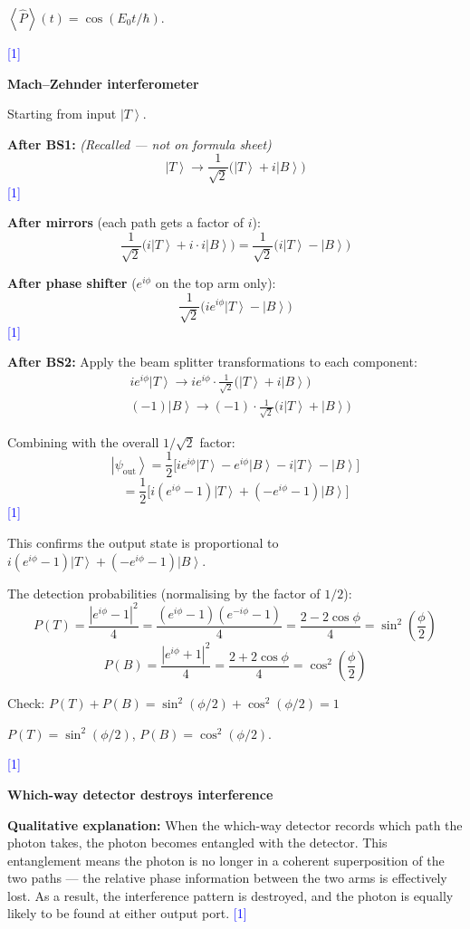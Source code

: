 \documentclass[12pt,a4paper]{article}
\newcommand{\markstep}[1]{\hfill\textcolor{blue}{[#1]}}
\newcommand{\finalanswer}[1]{%
  \begin{tcolorbox}[colback=green!5!white,colframe=green!50!black,boxrule=0.5pt]
  #1
  \end{tcolorbox}
}
\newcommand{\recalled}{\textit{(Recalled --- not on formula sheet)}}
\renewcommand{\ket}[1]{\left|#1\right\rangle}
\renewcommand{\expect}[1]{\left\langle #1\right\rangle}
\begin{document}
\begin{parts}
\finalanswer{$\expect{\hat{P}}(t) = \cos(E_0 t/\hbar)$.}
\markstep{1}

\item \textbf{Mach--Zehnder interferometer} 

Starting from input $\ket{T}$.

\textbf{After BS1:} \recalled
\[
\ket{T} \to \frac{1}{\sqrt{2}}\bigl(\ket{T} + i\ket{B}\bigr)
\]
\markstep{1}

\textbf{After mirrors} (each path gets a factor of $i$):
\[
\frac{1}{\sqrt{2}}\bigl(i\ket{T} + i\cdot i\ket{B}\bigr) = \frac{1}{\sqrt{2}}\bigl(i\ket{T} - \ket{B}\bigr)
\]

\textbf{After phase shifter} ($e^{i\phi}$ on the top arm only):
\[
\frac{1}{\sqrt{2}}\bigl(ie^{i\phi}\ket{T} - \ket{B}\bigr)
\]
\markstep{1}

\textbf{After BS2:} Apply the beam splitter transformations to each component:
\begin{align*}
&ie^{i\phi}\ket{T} \to ie^{i\phi}\cdot\frac{1}{\sqrt{2}}\bigl(\ket{T} + i\ket{B}\bigr) \\
&(-1)\ket{B} \to (-1)\cdot\frac{1}{\sqrt{2}}\bigl(i\ket{T} + \ket{B}\bigr)
\end{align*}

Combining with the overall $1/\sqrt{2}$ factor:
\[
\ket{\psi_{\text{out}}} = \frac{1}{2}\bigl[ie^{i\phi}\ket{T} - e^{i\phi}\ket{B} - i\ket{T} - \ket{B}\bigr]
\]
\[
= \frac{1}{2}\bigl[i(e^{i\phi} - 1)\ket{T} + (-e^{i\phi} - 1)\ket{B}\bigr]
\]
\markstep{1}

This confirms the output state is proportional to $i(e^{i\phi}-1)\ket{T} + (-e^{i\phi}-1)\ket{B}$.

The detection probabilities (normalising by the factor of $1/2$):
\[
P(T) = \frac{|e^{i\phi}-1|^2}{4} = \frac{(e^{i\phi}-1)(e^{-i\phi}-1)}{4} = \frac{2 - 2\cos\phi}{4} = \sin^2\!\left(\frac{\phi}{2}\right)
\]
\[
P(B) = \frac{|e^{i\phi}+1|^2}{4} = \frac{2 + 2\cos\phi}{4} = \cos^2\!\left(\frac{\phi}{2}\right)
\]

Check: $P(T) + P(B) = \sin^2(\phi/2) + \cos^2(\phi/2) = 1$ \checkmark

\finalanswer{$P(T) = \sin^2(\phi/2)$, \quad $P(B) = \cos^2(\phi/2)$.}
\markstep{1}

\item \textbf{Which-way detector destroys interference} 

\textbf{Qualitative explanation:} When the which-way detector records which path the photon takes, the photon becomes entangled with the detector. This entanglement means the photon is no longer in a coherent superposition of the two paths --- the relative phase information between the two arms is effectively lost. As a result, the interference pattern is destroyed, and the photon is equally likely to be found at either output port. \markstep{1}


\end{parts}
\end{document}
